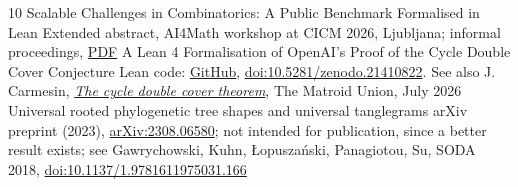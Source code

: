 \begin{otherlist}
{10 Scalable Challenges in Combinatorics: A Public Benchmark Formalised in Lean}
{Extended abstract, AI4Math workshop at CICM 2026, Ljubljana; informal proceedings,
\href{https://cicm-conference.org/2026/ai4math/04-okur.pdf}{PDF}%
}
{}{}
{A Lean 4 Formalisation of OpenAI's Proof of the Cycle Double Cover Conjecture}
{Lean code: \href{https://github.com/utkuokur/CycleDoubleCover_lean}{GitHub},
\href{https://doi.org/10.5281/zenodo.21410822}{doi:10.5281/zenodo.21410822}.
See also J. Carmesin, \emph{\href{https://matroidunion.org/?p=6255}{The cycle double cover theorem}},
The Matroid Union, July 2026}
{}{}
{Universal rooted phylogenetic tree shapes and universal tanglegrams}
{arXiv preprint (2023), \href{https://arxiv.org/abs/2308.06580}{arXiv:2308.06580};
not intended for publication, since a better result exists; see Gawrychowski, Kuhn,
Łopuszański, Panagiotou, Su, SODA 2018,
\href{https://doi.org/10.1137/1.9781611975031.166}{doi:10.1137/1.9781611975031.166}}
{}{}
\end{otherlist}
